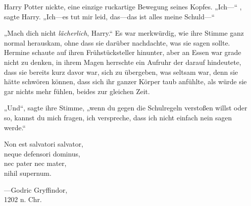 Harry Potter nickte, eine einzige ruckartige Bewegung seines Kopfes. „Ich—“ , sagte Harry. „Ich—es tut mir leid, das—das ist alles meine Schuld—“

„Mach dich nicht \emph{lächerlich}, Harry.“ Es war merkwürdig, wie ihre Stimme ganz normal herauskam, ohne dass sie darüber nachdachte, was sie sagen sollte. Hermine schaute auf ihren Frühstücksteller hinunter, aber an Essen war grade nicht zu denken, in ihrem Magen herrschte ein Aufruhr der darauf hindeutete, dass sie bereits kurz davor war, sich zu übergeben, was seltsam war, denn sie hätte schwören können, dass sich ihr ganzer Körper taub anfühlte, als würde sie gar nichts mehr fühlen, beides zur gleichen Zeit.

„Und“, sagte ihre Stimme, „wenn du gegen die Schulregeln verstoßen willst oder so, kannst du mich fragen, ich verspreche, dass ich nicht einfach nein sagen werde.“

\later

\begin{center}
Non est salvatori salvator,\\
neque defensori dominus,\\
nec pater nec mater,\\
nihil supernum.

—Godric Gryffindor,\\
1202 n. Chr.
\end{center}

